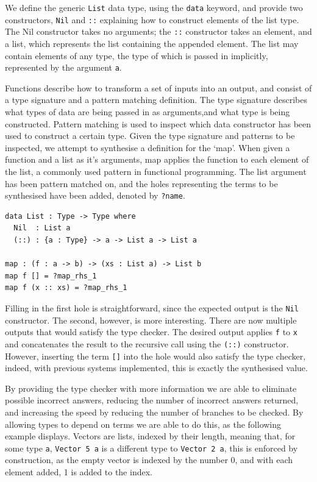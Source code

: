 \documentclass[a4paper]{article}
\begin{document}
We define the generic \texttt{List} data type, using the \texttt{data}
keyword, and provide two constructors, \texttt{Nil} and \texttt{::}
explaining how to construct elements of the list type. The Nil constructor takes no arguments; the \texttt{::} constructor takes an element, and
a list, which represents the list containing the appended element.
The list may contain elements of any type, the type of which is
passed in implicitly, represented by the argument \texttt{a}.

Functions describe how to transform a set of inputs into an output, and
consist of a type signature and a pattern matching definition. The type
signature describes what types of data are being passed in as arguments,and what type is being constructed. Pattern matching is used to inspect
which data constructor has been used to construct a certain type.
Given the type signature and patterns to be inspected, we attempt to
synthesise a definition for the `map'. When given a function and
a list as it's arguments, map applies the function to each element of
the list, a commonly used pattern in functional programming. The list
argument has been pattern matched on, and the holes representing the
terms to be synthesised
have been added, denoted by \texttt{?name}.

\begin{center}
\begin{verbatim}
data List : Type -> Type where
  Nil  : List a
  (::) : {a : Type} -> a -> List a -> List a

map : (f : a -> b) -> (xs : List a) -> List b 
map f [] = ?map_rhs_1
map f (x :: xs) = ?map_rhs_1
\end{verbatim}
\end{center}

Filling in the first hole is straightforward, since the expected output 
is the \texttt{Nil} constructor. The second, however, is more interesting.
There are now multiple outputs that would satisfy the type checker. 
The desired output applies \texttt{f} to \texttt{x} and concatenates the result to the
recursive call using the \texttt{(::)} constructor. However, inserting the term
\texttt{[]} into the hole would also satisfy the type checker, indeed,
with previous systems implemented, this is exactly the synthesised 
value.

By providing the type checker with more information we are able to 
eliminate possible incorrect answers, reducing the number of incorrect 
answers returned, and increasing the speed by reducing the number of 
branches to be checked. By allowing types to depend on terms we are 
able to do this, as the following example displays. Vectors are lists,
indexed by their length, meaning that, for some type \texttt{a},
\texttt{Vector 5 a} is a different type to \texttt{Vector 2 a}, this
is enforced by construction, as the empty vector is indexed by the
number 0, and with each element added, 1 is added to the index.  
\end{document}
